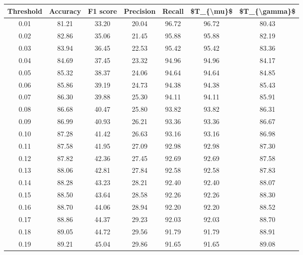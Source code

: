 \begin{tabular}{|c|c|c|c|c|c|c|}
\hline
 Threshold &  Accuracy &  F1 score &  Precision &  Recall &  \$T\_\{\textbackslash mu\}\$ &  \$T\_\{\textbackslash gamma\}\$ \\
\hline
      0.01 &     81.21 &     33.20 &      20.04 &   96.72 &      96.72 &         80.43 \\
      0.02 &     82.86 &     35.06 &      21.45 &   95.88 &      95.88 &         82.19 \\
      0.03 &     83.94 &     36.45 &      22.53 &   95.42 &      95.42 &         83.36 \\
      0.04 &     84.69 &     37.45 &      23.32 &   94.96 &      94.96 &         84.17 \\
      0.05 &     85.32 &     38.37 &      24.06 &   94.64 &      94.64 &         84.85 \\
      0.06 &     85.86 &     39.19 &      24.73 &   94.38 &      94.38 &         85.43 \\
      0.07 &     86.30 &     39.88 &      25.30 &   94.11 &      94.11 &         85.91 \\
      0.08 &     86.68 &     40.47 &      25.80 &   93.82 &      93.82 &         86.31 \\
      0.09 &     86.99 &     40.93 &      26.21 &   93.36 &      93.36 &         86.67 \\
      0.10 &     87.28 &     41.42 &      26.63 &   93.16 &      93.16 &         86.98 \\
      0.11 &     87.58 &     41.95 &      27.09 &   92.98 &      92.98 &         87.30 \\
      0.12 &     87.82 &     42.36 &      27.45 &   92.69 &      92.69 &         87.58 \\
      0.13 &     88.06 &     42.81 &      27.84 &   92.58 &      92.58 &         87.83 \\
      0.14 &     88.28 &     43.23 &      28.21 &   92.40 &      92.40 &         88.07 \\
      0.15 &     88.50 &     43.64 &      28.58 &   92.26 &      92.26 &         88.30 \\
      0.16 &     88.70 &     44.06 &      28.94 &   92.20 &      92.20 &         88.52 \\
      0.17 &     88.86 &     44.37 &      29.23 &   92.03 &      92.03 &         88.70 \\
      0.18 &     89.05 &     44.72 &      29.56 &   91.79 &      91.79 &         88.91 \\
      0.19 &     89.21 &     45.04 &      29.86 &   91.65 &      91.65 &         89.08 \\

\end{tabular}
